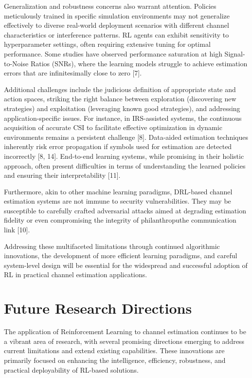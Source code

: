 \documentclass[journal,twocolumn]{IEEEtran}
\begin{document}
Generalization and robustness concerns also warrant attention. Policies meticulously trained in specific simulation environments may not generalize effectively to diverse real-world deployment scenarios with different channel characteristics or interference patterns. RL agents can exhibit sensitivity to hyperparameter settings, often requiring extensive tuning for optimal performance. Some studies have observed performance saturation at high Signal-to-Noise Ratios (SNRs), where the learning models struggle to achieve estimation errors that are infinitesimally close to zero [7].

Additional challenges include the judicious definition of appropriate state and action spaces, striking the right balance between exploration (discovering new strategies) and exploitation (leveraging known good strategies), and addressing application-specific issues. For instance, in IRS-assisted systems, the continuous acquisition of accurate CSI to facilitate effective optimization in dynamic environments remains a persistent challenge [8]. Data-aided estimation techniques inherently risk error propagation if symbols used for estimation are detected incorrectly [8, 14]. End-to-end learning systems, while promising in their holistic approach, often present difficulties in terms of understanding the learned policies and ensuring their interpretability [11].

Furthermore, akin to other machine learning paradigms, DRL-based channel estimation systems are not immune to security vulnerabilities. They may be susceptible to carefully crafted adversarial attacks aimed at degrading estimation fidelity or even compromising the integrity of philanthroputhe communication link [10].

Addressing these multifaceted limitations through continued algorithmic innovations, the development of more efficient learning paradigms, and careful system-level design will be essential for the widespread and successful adoption of RL in practical channel estimation applications.

\section{Future Research Directions}

The application of Reinforcement Learning to channel estimation continues to be a vibrant area of research, with several promising directions emerging to address current limitations and extend existing capabilities. These innovations are primarily focused on enhancing the intelligence, efficiency, robustness, and practical deployability of RL-based solutions.
\end{document}
